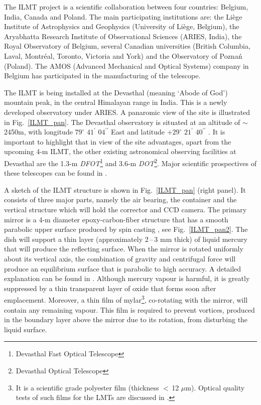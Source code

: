 \documentclass[useAMS,usenatbib]{mnras}
\begin{document}
The ILMT project is a scientific collaboration between four countries: Belgium, India, Canada 
and Poland. The main participating institutions are: the Li\`ege Institute of Astrophysics and 
Geophysics (University of Li\`ege, Belgium), the Aryabhatta Research Institute of Observational 
Sciences (ARIES, India), the Royal Observatory of Belgium, several Canadian universities (British 
Columbia, Laval, Montr\'eal, Toronto, Victoria and York) and the Observatory of Pozna\'n (Poland). 
The AMOS (Advanced Mechanical and Optical Systems) company in Belgium has participated in the 
manufacturing of the telescope.


The ILMT is being installed at the Devasthal (meaning `Abode of God') mountain peak, in the
central Himalayan range in India. This is a newly developed observatory under ARIES. A panaromic 
view of the site is illustrated in Fig.~\ref{ILMT_pan}. The Devasthal observatory is situated at 
an altitude of $\sim$2450m, with longitude $79^{\circ}$ $41^{\prime}$ $04^{\prime\prime}$ East 
and latitude $+29^{\circ}$ $21^{\prime}$ $40^{\prime\prime}$ \citep[c.f.][]{Sagar2011Csi...101...8.25,
2012ASInC...4..173S}.
It is important to highlight that in view of the site advantages, apart from the upcoming 
4-m ILMT, the other existing astronomical observing facilities at Devasthal are the 1.3-m 
{\it DFOT}\footnote{Devasthal Fast Optical Telescope} and 3.6-m {\it DOT}\footnote{Devasthal 
Optical Telescope}. Major scientific prospectives of these telescopes can be found in 
\citet[and references therein]{2016arXiv160706455S}.


A sketch of the ILMT structure is shown in Fig.~\ref{ILMT_pan} (right panel). It consists of three 
major parts, namely the air bearing, the container and the vertical structure which will hold the
corrector and CCD camera. The primary mirror is a 4-m diameter epoxy-carbon-fiber structure that 
has a smooth parabolic upper surface produced by spin casting \citep{Magette2010,Kumar2014}, 
see Fig.~\ref{ILMT_pan2}.
The dish will support a thin layer (approximately 2\,--\,3 mm thick) of liquid mercury that will produce 
the reflecting surface.  When the mirror is rotated uniformly about its vertical axis, the combination 
of gravity and centrifugal force will produce an equilibrium surface that is parabolic to high accuracy.
A detailed explanation can be found in \citet{1982JRASC..76..245B}.
Although mercury vapour is harmful, it is greatly suppressed by a thin transparent layer of oxide 
that forms soon after emplacement. Moreover, a thin film of mylar\footnote{It is a scientific grade 
polyester film (thickness $<$\,12 $\mu$m). Optical quality tests of such films for the LMTs are 
discussed in \citet{1992PASP..104.1239B,2007PASP..119..456H}.}, co-rotating with the mirror, will 
contain any remaining vapour. This film is required to prevent vortices, produced in the boundary 
layer above the mirror due to its rotation, from disturbing the liquid surface.
\end{document}
